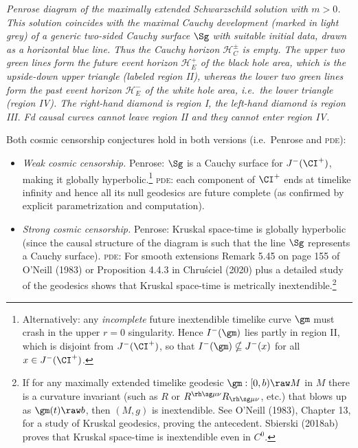 \documentclass[12pt]{article}
\newcommand{\pde}{\textsc{pde}}
\begin{document}
\emph{Penrose diagram of the maximally extended Schwarzschild solution with $m>0$. This solution coincides with the maximal Cauchy development (marked in light grey) of a generic two-sided Cauchy surface $\Sg$ with suitable initial data, drawn as a horizontal blue line.  Thus the Cauchy horizon $\mathcal{H}^{\pm}_C$ is empty. The upper two green lines form the future event horizon $\mathcal{H}^+_E$ of the black hole area, which is the upside-down upper triangle (labeled region II), whereas the lower two green lines form the past event horizon $\mathcal{H}^-_E$ of the white hole area, i.e.\ the  lower triangle (region IV). The right-hand diamond is region I, the left-hand diamond is region III.
Fd causal curves cannot \emph{leave} region II and they cannot 
\emph{enter} region IV.
}\smallskip

 Both cosmic censorship conjectures hold in both versions (i.e.\ Penrose and \pde):
\begin{itemize}
\item  \emph{Weak  cosmic censorship.} Penrose:  $\Sg$ is a Cauchy surface for $J^-(\CI^+)$, making it globally hyperbolic.\footnote{Alternatively: any \emph{incomplete} future inextendible timelike curve $\gm$  must crash in the upper $r=0$ singularity. Hence $I^-(\gm)$ lies partly in region II, which is disjoint from $J^-(\CI^+)$, so that $I^-(\gm)\nsubseteq J^-(x)$  for all $x\in J^-(\CI^+)$.} \pde: each component of $\CI^+$ ends  at timelike infinity and hence all its null geodesics are future complete (as confirmed by explicit parametrization and computation). 
\item \emph{Strong  cosmic censorship.}   Penrose: Kruskal space-time is globally hyperbolic (since the causal structure
of the diagram  is such that the line $\Sg$ represents a Cauchy surface).
 \pde: For smooth extensions
 Remark 5.45 on page 155 of O'Neill (1983) or Proposition 4.4.3 in  Chru\'{s}ciel (2020) plus a detailed study of the geodesics shows that  Kruskal space-time is metrically
 inextendible.\footnote{ If for any maximally extended timelike geodesic $\gm:[0,b)\raw M$ in $M$ there is a curvature invariant (such as $R$ or $R^{\rh\sg\mu\nu}R_{\rh\sg\mu\nu}$, etc.)
  that blows up as $\gm(t)\raw b$, then $(M,g)$ is  inextendible. 
 See O'Neill (1983), Chapter 13, for a study of Kruskal geodesics,  proving the antecedent.
Sbierski (2018ab) proves that Kruskal space-time is inextendible even in $C^0$.}
\end{itemize}
\end{document}
